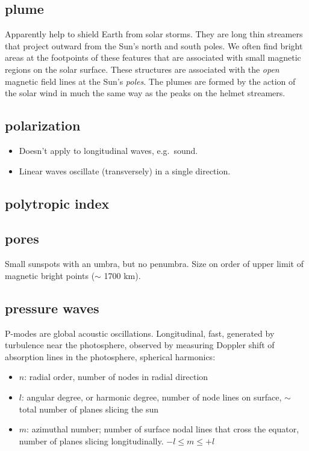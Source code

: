 \documentclass{article}
\begin{document}
\subsection{plume}
Apparently help to shield Earth from solar storms.
They are long thin streamers that project outward from the Sun's north and
south poles. We often find bright areas at the footpoints of these
features that are associated with small magnetic regions on the solar
surface. These structures are associated with the \emph{open} magnetic
field lines at the Sun's \emph{poles}. The plumes are formed by the action of
the solar wind in much the same way as the peaks on the helmet
streamers.
\subsection{polarization}
\begin{itemize}
    \item Doesn't apply to longitudinal waves, e.g.\ sound.
    \item Linear waves oscillate (transversely) in a single direction.
\end{itemize}

\subsection{polytropic index}
\subsection{pores}
Small sunspots with an umbra, but no penumbra.
Size on order of upper limit of magnetic bright points ($\sim$ 1700
km).
\subsection{pressure waves}
P-modes are global acoustic oscillations.
Longitudinal, fast, generated by turbulence near the photosphere,
observed by measuring Doppler shift of absorption lines in the
photosphere, spherical harmonics:
\begin{itemize}
    \item $n$: radial order, number of nodes in radial direction
    \item $l$: angular degree, or harmonic degree,
        number of node lines on surface,
        $\sim$ total number of planes slicing the sun
    \item $m$: azimuthal number;
        number of surface nodal lines that cross the equator,
        number of planes slicing longitudinally. $-l\leq m\leq +l$
\end{itemize}
\end{document}
